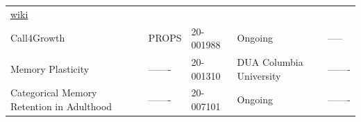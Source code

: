 \documentclass[]{book}
\begin{document}
\begin{longtable}[]{@{}lllll@{}}
\begin{minipage}[t]{0.10\columnwidth}
\href{https://bablab.github.io/wiki_gusto/}{wiki}\strut
\end{minipage}\tabularnewline
\begin{minipage}[t]{0.32\columnwidth}\raggedright
Call4Growth\strut
\end{minipage} & \begin{minipage}[t]{0.21\columnwidth}\raggedright
PROPS\strut
\end{minipage} & \begin{minipage}[t]{0.13\columnwidth}\raggedright
20-001988\strut
\end{minipage} & \begin{minipage}[t]{0.10\columnwidth}\raggedright
Ongoing\strut
\end{minipage} & \begin{minipage}[t]{0.10\columnwidth}\raggedright
-----\strut
\end{minipage}\tabularnewline
\begin{minipage}[t]{0.32\columnwidth}\raggedright
Memory Plasticity\strut
\end{minipage} & \begin{minipage}[t]{0.21\columnwidth}\raggedright
-------\strut
\end{minipage} & \begin{minipage}[t]{0.13\columnwidth}\raggedright
20-001310\strut
\end{minipage} & \begin{minipage}[t]{0.10\columnwidth}\raggedright
DUA Columbia University\strut
\end{minipage} & \begin{minipage}[t]{0.10\columnwidth}\raggedright
-------\strut
\end{minipage}\tabularnewline
\begin{minipage}[t]{0.32\columnwidth}\raggedright
Categorical Memory Retention in Adulthood\strut
\end{minipage} & \begin{minipage}[t]{0.21\columnwidth}\raggedright
-------\strut
\end{minipage} & \begin{minipage}[t]{0.13\columnwidth}\raggedright
20-007101\strut
\end{minipage} & \begin{minipage}[t]{0.10\columnwidth}\raggedright
Ongoing\strut
\end{minipage} & \begin{minipage}[t]{0.10\columnwidth}\raggedright
-------\strut
\end{minipage}\tabularnewline

\end{longtable}
\end{document}

